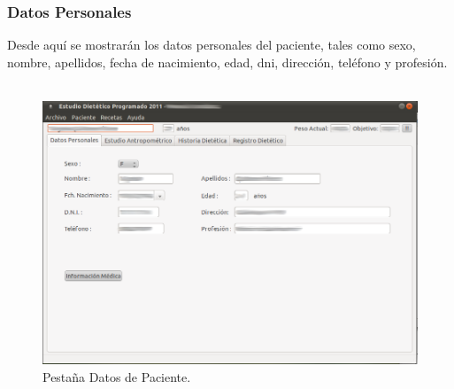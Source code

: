 \subsubsection{Datos Personales}
Desde aquí se mostrarán los datos personales del paciente, tales como sexo, nombre, apellidos, fecha de nacimiento, edad, dni, dirección, teléfono y profesión.\\\\
\begin{figure}[H]
  \label{datos_paciente}
  \begin{center}
    \includegraphics[scale=0.5]{../../Image/paciente-datos.png}
  \end{center}
  \caption{Pestaña Datos de Paciente.}
\end{figure}


